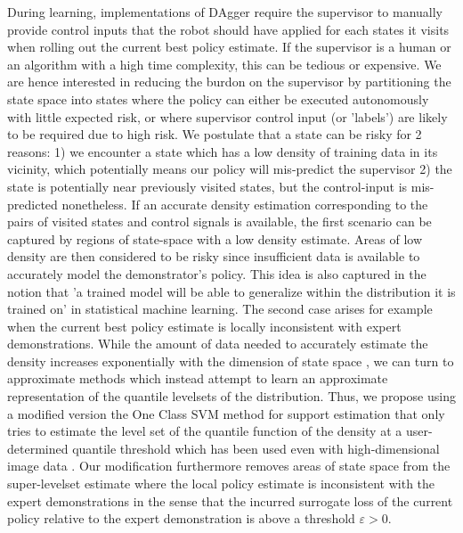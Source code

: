 \documentclass[10pt, conference]{ieeeconf}      %
\begin{document}
During learning, implementations of DAgger require the supervisor to manually provide control inputs that the robot
should have applied for each states it visits when rolling out the current best policy estimate. If the supervisor is a
human or an algorithm with a high time complexity, this can be tedious or expensive. We are hence interested in
reducing the burdon on the supervisor by partitioning the state space into states where the policy can either be
executed autonomously with little expected risk, or where supervisor control input (or 'labels') are likely to be
required due to high risk. We postulate that a state can be risky for 2 reasons: 1) we encounter a state which has a low density of
training data in its vicinity, which potentially means our policy will mis-predict the supervisor
\cite{tokdar2010importance} 2) the state is potentially near previously visited states, but the control-input is mis-predicted
nonetheless. If an accurate density estimation corresponding to
the pairs of visited states and control signals is available, the first scenario can be captured by regions of
state-space with a low density estimate. Areas of low density are then considered to be risky since insufficient data
is available to accurately model the demonstrator's policy. This idea is also captured in the notion that 'a trained
model will be able to generalize within the distribution it is trained on' \cite{tokdar2010importance} in statistical
machine learning. The second case arises for example when the current best policy estimate is locally inconsistent with expert
demonstrations.
%
%
While the amount of data needed to accurately estimate the density increases exponentially with the dimension of state
space \cite{nadaraya1964estimating}, we can turn to approximate methods which instead attempt to learn an approximate
representation of the quantile levelsets of the distribution. Thus, we propose using a modified version the One Class
SVM method for support estimation that only tries to estimate the level set of the quantile function of the density
\cite{scholkopf2001estimating} at a user-determined quantile threshold which has been used even with high-dimensional
image data \cite{liu2014unsupervised}. Our modification furthermore removes areas of state space from the super-levelset
estimate where the local policy estimate is inconsistent with the expert demonstrations in the sense that the incurred
surrogate loss of the current policy relative to the expert demonstration is above a threshold $\varepsilon>0$.
\end{document}
